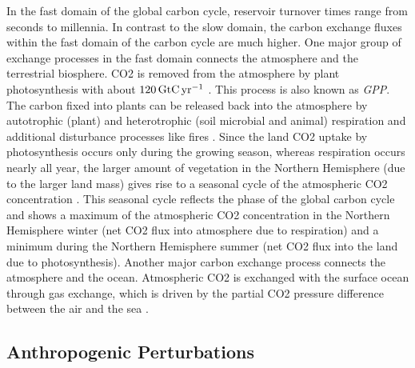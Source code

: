 In the fast domain of the global carbon cycle, reservoir turnover times range
from seconds to millennia. In contrast to the slow domain, the carbon exchange
fluxes within the fast domain of the carbon cycle are much higher. One major
group of exchange processes in the fast domain connects the atmosphere and the
terrestrial biosphere. \ac{CO2} is removed from the atmosphere by plant
photosynthesis with about $120 \unit{\GtCyr{}}$ \autocite{Ciais2013}. This
process is also known as \emph{\ac{GPP}}. The carbon fixed into plants can be
released back into the atmosphere by autotrophic (plant) and heterotrophic
(soil microbial and animal) respiration and additional disturbance processes
like fires \autocite{Ciais2013}. Since the land \ac{CO2} uptake by
photosynthesis occurs only during the growing season, whereas respiration
occurs nearly all year, the larger amount of vegetation in the Northern
Hemisphere (due to the larger land mass) gives rise to a seasonal cycle of the
atmospheric \ac{CO2} concentration \autocite{Keeling1995}. This seasonal cycle
reflects the phase of the global carbon cycle and shows a maximum of the
atmospheric \ac{CO2} concentration in the Northern Hemisphere winter (net
\ac{CO2} flux into atmosphere due to respiration) and a minimum during the
Northern Hemisphere summer (net \ac{CO2} flux into the land due to
photosynthesis). Another major carbon exchange process connects the atmosphere
and the ocean. Atmospheric \ac{CO2} is exchanged with the surface ocean through
gas exchange, which is driven by the partial \ac{CO2} pressure difference
between the air and the sea \autocite{Ciais2013}.


\subsection{Anthropogenic Perturbations}
\label{subsec:02:carbon_cycle_perturbations}

